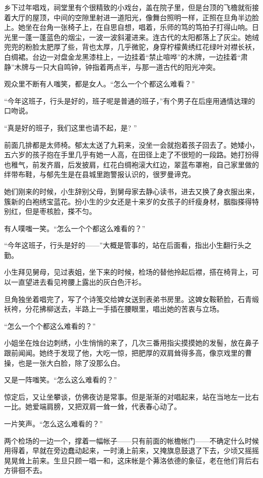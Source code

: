 \par 乡下过年唱戏，祠堂里有个很精致的小戏台，盖在院子里，但是台顶的飞檐就衔接着大厅的屋顶，中间的空隙里射进一道阳光，像舞台照明一样，正照在旦角半边脸上。她坐在台角一张椅子上，在自思自想，唱着，乐师的笃的笃拍子打得山响。日光里一蓬一蓬蓝色的烟尘，一波一波斜灌进来。连古代的太阳都落上了灰尘。她绒兜兜的粉脸太肥厚了些，背也太厚，几乎微驼，身穿柠檬黄绣红花绿叶对襟长袄，白绸裙。台边一对盘金龙黑漆柱上，一边挂着“禁止喧哗”的木牌，一边挂着“肃静”木牌与一只大自鸣钟，钟指着两点半，与那一道古代的阳光冲突。
\par 观众里不断有人嗤笑，都是女人。“怎么一个个都这么难看？”
\par “今年这班子，行头是好的，班子呢是普通的班子，”有个男子在后座用通情达理的口吻说。
\par “真是好的班子，我们这里也请不起，是? ”
\par 前面几排都是太师椅。郁太太送了九莉来，没坐一会就抱着孩子回去了。她矮小，五六岁的孩子抱在手里几乎有她一人高，在田径上走了不很短的一段路。她打扮得也稚气，前发齐眉，后发披肩，红花白绸袍滚大红边，翠蓝布罩袍，自己家里做的绊带布鞋，与郁先生是在县城里跑警报认识的，很罗曼谛克。
\par 她们刚来的时候，小生辞别父母，到舅母家去静心读书，进去又换了身衣服出来，簇新的白袍绣宝蓝花。扮小生的少女还是十来岁的女孩子的纤瘦身材，胭脂搽得特别红，但是枣核脸，搽不匀。
\par 有人噗嗤一笑。“怎么一个个都这么难看的？”
\par “今年这班子，行头是好的——”大概是管事的，站在后面看，指出小生翻行头之勤。
\par 小生拜见舅母，见过表姐，坐下来的时候，检场的替他拎起后襟，搭在椅背上，可以一直望进去看见袴腰上露出的灰白色汗衫。
\par 旦角独坐着唱完了，写了个诗笺交给婢女送到表弟书房里。这婢女鞍鞒脸，石青缎袄袴，分花拂柳送去，半路上一手插在腰眼里，唱出她的苦衷与立场。
\par “怎么一个个都这么难看的？”
\par 小姐坐在烛台边刺绣，小生悄悄的来了，几次三番用指尖摸摸她的发髻，放在鼻子跟前闻闻。她终于发现了他，大吃一惊，把肥厚的双肩耸得多高，像京戏里的曹操，也是一张大白脸，除了没那么白。
\par 又是一阵嗤笑。“怎么这么难看的？”
\par 惊定后，又让坐攀谈，仿佛夜访是常事。但是渐渐的对唱起来，站在当地左一比右一比。她爱端肩膀，又把双肩一耸一耸，代表春心动了。
\par 一片笑声。“怎么这么难看的？”
\par 两个检场的一边一个，撑着一幅帐子——只有前面的帐檐帐门——不确定什么时候用得着，早就在旁边蠢动起来，一时湧上前来，又掩旗息鼓退了下去，少顷又摇摇晃晃耸上前来。生旦只顾一唱一和，这床帐是个茀洛依德的象征，老在他们背后右方徘徊不去。

